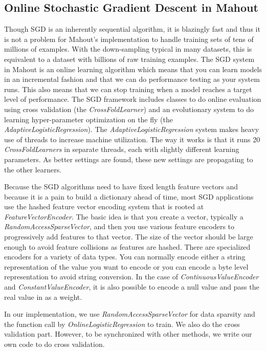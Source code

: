 \documentclass[10pt, conference, compsocconf]{IEEEtran}
\begin{document}
\subsection{Online Stochastic Gradient Descent in Mahout}
Though SGD is an inherently sequential algorithm, it is blazingly fast and thus it is not a problem for Mahout's implementation to handle training sets of tens of millions of examples.
With the down-sampling typical in many datasets, this is equivalent to a dataset with billions of raw training examples.
The SGD system in Mahout is an online learning algorithm which means that you can learn models in an incremental fashion and that we can do performance testing as your system runs.
This also means that we can stop training when a model reaches a target level of performance.
The SGD framework includes classes to do online evaluation using cross validation (the \textit{CrossFoldLearner}) and an evolutionary system to do learning hyper-parameter optimization on the fly (the \textit{AdaptiveLogisticRegression}).
The \textit{AdaptiveLogisticRegression} system makes heavy use of threads to increase machine utilization.
The way it works is that it runs 20 \textit{CrossFoldLearners} in separate threads, each with slightly different learning parameters.
As better settings are found, these new settings are propagating to the other learners.

Because the SGD algorithms need to have fixed length feature vectors and because it is a pain to build a dictionary ahead of time, most SGD applications use the hashed feature vector encoding system that is rooted at \textit{FeatureVectorEncoder}.
The basic idea is that you create a vector, typically a \textit{RandomAccessSparseVector}, and then you use various feature encoders to progressively add features to that vector.
The size of the vector should be large enough to avoid feature collisions as features are hashed.
There are specialized encoders for a variety of data types.
You can normally encode either a string representation of the value you want to encode or you can encode a byte level representation to avoid string conversion.
In the case of \textit{ContinuousValueEncoder} and \textit{ConstantValueEncoder}, it is also possible to encode a null value and pass the real value in as a weight.

In our implementation, we use \textit{RandomAccessSparseVector} for data sparsity and the function call by \textit{OnlineLogisticRegression} to train.
We also do the cross validation part. However, to be synchronized with other methods, we write our own code to do cross validation.
	
\end{document}
